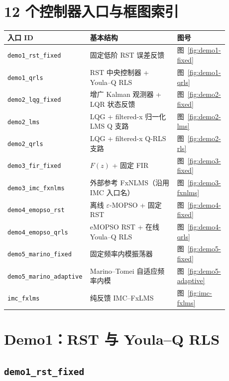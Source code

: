 \documentclass[UTF8,11pt,a4paper]{ctexart}
\begin{document}
\section{12 个控制器入口与框图索引}

\begin{longtable}{p{0.31\linewidth}p{0.39\linewidth}p{0.18\linewidth}}
\toprule
入口 ID & 基本结构 & 图号\\
\midrule
\endhead
\texttt{demo1\_rst\_fixed} & 固定低阶 RST 误差反馈 & 图~\ref{fig:demo1-fixed}\\
\texttt{demo1\_qrls} & RST 中央控制器 + Youla--Q RLS & 图~\ref{fig:demo1-qrls}\\
\texttt{demo2\_lqg\_fixed} & 增广 Kalman 观测器 + LQR 状态反馈 & 图~\ref{fig:demo2-fixed}\\
\texttt{demo2\_lms} & LQG + filtered-x 归一化 LMS Q 支路 & 图~\ref{fig:demo2-lms}\\
\texttt{demo2\_qrls} & LQG + filtered-x Q-RLS 支路 & 图~\ref{fig:demo2-rls}\\
\texttt{demo3\_fir\_fixed} & $F(z)$ + 固定 FIR & 图~\ref{fig:demo3-fixed}\\
\texttt{demo3\_imc\_fxnlms} & 外部参考 FxNLMS（沿用 IMC 入口名） & 图~\ref{fig:demo3-fxnlms}\\
\texttt{demo4\_emopso\_rst} & 离线 $\varepsilon$-MOPSO + 固定 RST & 图~\ref{fig:demo4-fixed}\\
\texttt{demo4\_emopso\_qrls} & eMOPSO RST + 在线 Youla--Q RLS & 图~\ref{fig:demo4-qrls}\\
\texttt{demo5\_marino\_fixed} & 固定频率内模振荡器 & 图~\ref{fig:demo5-fixed}\\
\texttt{demo5\_marino\_adaptive} & Marino--Tomei 自适应频率内模 & 图~\ref{fig:demo5-adaptive}\\
\texttt{imc\_fxlms} & 纯反馈 IMC--FxLMS & 图~\ref{fig:imc-fxlms}\\
\bottomrule
\end{longtable}

\section{Demo1：RST 与 Youla--Q RLS}

\subsection{\texttt{demo1\_rst\_fixed}}
\end{document}
